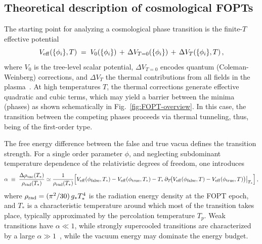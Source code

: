 \documentclass[a4paper,11pt]{article}
\begin{document}
\subsection{Theoretical description of cosmological FOPTs}
\label{sec:thermo}

The starting point for analyzing a cosmological phase transition is the finite-$T$ effective potential
\begin{equation}
  V_{\rm eff}(\{\phi_i\},T)
  \;=\; V_0(\{\phi_i\}) \,+\, \Delta V_{T=0}(\{\phi_i\}) \,+\, \Delta V_T(\{\phi_i\},T)\,,
\end{equation}
where $V_0$ is the tree-level scalar potential, $\Delta V_{T=0}$ encodes quantum (Coleman-Weinberg) 
corrections, and $\Delta V_T$ the thermal contributions from all fields in the
plasma~\citep{Dolan:1973qd,Coleman:1973jx,Kirzhnits:1976ts,Quiros:1999jp,Kapusta:2006pm}. At high temperatures $T$, 
the thermal corrections generate effective quadratic and cubic terms, which may yield a barrier between the 
minima (phases) as shown schematically in Fig.~\ref{fig:FOPT-overview}. In this case, the transition between 
the competing phases proceeds via thermal tunneling, thus, being of the first-order type.

The free energy difference between the false and true vacua defines the transition strength. For a single 
order parameter $\phi$, and neglecting subdominant temperature dependence of the relativistic degrees of freedom, 
one introduces
\begin{equation}
  \alpha \;\equiv\;
  \frac{\Delta\rho_{\rm vac}(T_*)}{\rho_{\rm rad}(T_*)}
  \simeq
  \frac{1}{\rho_{\rm rad}(T_*)}\Big[V_{\rm eff}(\phi_{\rm false},T_*) - V_{\rm eff}(\phi_{\rm true},T_*)
  - T_*\,\partial_T\!\big(V_{\rm eff}(\phi_{\rm false},T) - V_{\rm eff}(\phi_{\rm true},T)\big)\big|_{T_*}\Big]\,,
\end{equation}
where $\rho_{\rm rad} = (\pi^2/30)\, g_* T_*^4$ is the radiation energy density at the FOPT epoch, and $T_*$ 
is a characteristic temperature around which most of the transition takes place, typically approximated by 
the percolation temperature $T_p$. Weak transitions have $\alpha \ll 1$, while strongly supercooled 
transitions are characterized by a large $\alpha \gg 1$~\citep{Espinosa:2010hh,Ellis:2019oqb,Athron:2022mmm}, 
while the vacuum energy may dominate the energy budget.
\end{document}
